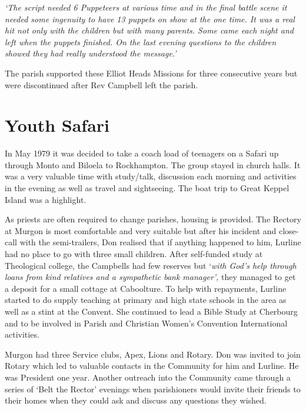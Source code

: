 \emph{`The script needed 6 Puppeteers at various time and in the final battle scene it needed some ingenuity to have 13 puppets on show at the one time. It was a real hit not only with the children but with many parents. Some came each night and left when the puppets finished. On the last evening questions to the children showed they had really understood the message.'}



The parish supported these Elliot Heads Missions for three consecutive years but were discontinued after Rev Campbell left the parish.



\section{Youth Safari}



In May 1979 it was decided to take a coach load of teenagers on a Safari up through Monto and Biloela to Rockhampton. The group stayed in church halls. It was a very valuable time with study/talk, discussion each morning and activities in the evening as well as travel and sightseeing. The boat trip to Great Keppel Island was a highlight.



As priests are often required to change parishes, housing is provided. The Rectory at Murgon is most comfortable and very suitable but after his incident and close-call with the semi-trailers, Don realised that if anything happened to him, Lurline had no place to go with three small children. After self-funded study at Theological college, the Campbells had few reserves but `\emph{with God's help through loans from kind relatives and a sympathetic bank manager',} they managed to get a deposit for a small cottage at Caboolture. To help with repayments, Lurline started to do supply teaching at primary and high state schools in the area as well as a stint at the Convent. She continued to lead a Bible Study at Cherbourg and to be involved in Parish and Christian Women's Convention International activities.



Murgon had three Service clubs, Apex, Lions and Rotary. Don was invited to join Rotary which led to valuable contacts in the Community for him and Lurline. He was President one year. Another outreach into the Community came through a series of `Belt the Rector' evenings when parishioners would invite their friends to their homes when they could ask and discuss any questions they wished.




